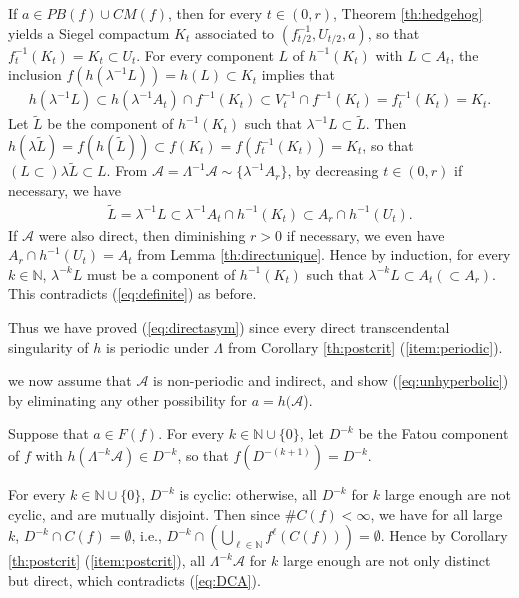 \documentclass[a4paper,12pt]{amsart}
\theoremstyle{plain}
\theoremstyle{definition}
\theoremstyle{remark}
\numberwithin{equation}{section}
\begin{document}
If $a\in{\mathit{PB}}(f)\cup{\mathit{CM}}(f)$, then for every $t\in (0,r)$,
Theorem \ref{th:hedgehog} yields a Siegel compactum $K_t$
associated to $(f^{-1}_{t/2},U_{t/2},a)$, 
so that $f^{-1}_t(K_t)=K_t\subset U_t$.
For every component $L$ of $h^{-1}(K_t)$ with $L\subset A_t$,
the inclusion $f(h(\lambda^{-1}L))=h(L)\subset K_t$ implies that
\begin{gather*}
 h(\lambda^{-1}L)\subset h(\lambda^{-1}A_t)\cap f^{-1}(K_t)\subset V^{-1}_t\cap f^{-1}(K_t)=f^{-1}_t(K_t)=K_t.
\end{gather*}
Let $\tilde{L}$ be the component of $h^{-1}(K_t)$
such that $\lambda^{-1}L\subset\tilde{L}$. Then 
$h(\lambda\tilde{L})=f(h(\tilde{L}))\subset f(K_t)=f(f^{-1}_t(K_t))=K_t$,
so that $(L\subset)\lambda\tilde{L}\subset L$.
From $\mathcal{A}=\Lambda^{-1}\mathcal{A}\sim\{\lambda^{-1}A_r\}$,
by decreasing $t\in(0,r)$ if necessary, we have
\begin{gather*}
 \tilde{L}=\lambda^{-1}L\subset\lambda^{-1}A_t\cap h^{-1}(K_t)\subset A_r\cap h^{-1}(U_t).\label{eq:induction}
\end{gather*}
If $\mathcal{A}$ were also direct, then diminishing $r>0$ if necessary,
we even have $A_r\cap h^{-1}(U_t)=A_t$ from Lemma \ref{th:directunique}.
Hence by induction,
for every $k\in{\mathbb{N}}$, $\lambda^{-k}L$ must be a component of $h^{-1}(K_t)$ 
such that $\lambda^{-k}L\subset A_t(\subset A_r)$.
This contradicts (\ref{eq:definite}) as before.

Thus we have proved (\ref{eq:directasym})
since every direct transcendental singularity of $h$ is periodic under $\Lambda$
from Corollary \ref{th:postcrit} (\ref{item:periodic}).

{\smallskip {}\nopagebreak[4]} 
we now assume that $\mathcal{A}$ is non-periodic and indirect, and show
(\ref{eq:unhyperbolic}) 
by eliminating any other possibility for $a=h(\mathcal{A}$). 

Suppose that $a\in F(f)$. For every $k\in{\mathbb{N}}\cup\{0\}$, 
let $D^{-k}$ be the Fatou component of $f$ with
$h(\Lambda^{-k}\mathcal{A})\in D^{-k}$, so that $f(D^{-(k+1)})=D^{-k}$.

For every $k\in{\mathbb{N}}\cup\{0\}$, $D^{-k}$ is cyclic:
otherwise, all $D^{-k}$ for $k$ large enough are not cyclic,
and are mutually disjoint. Then since $\#C(f)<\infty$, 
we have for all large $k$, $D^{-k}\cap C(f)=\emptyset$, i.e.,
$D^{-k}\cap(\bigcup_{\ell\in{\mathbb{N}}}f^{\ell}(C(f)))=\emptyset$.
Hence by Corollary \ref{th:postcrit} (\ref{item:postcrit}),
all $\Lambda^{-k}\mathcal{A}$ for $k$ large enough
are not only distinct but direct, which contradicts (\ref{eq:DCA}).
\end{document}
